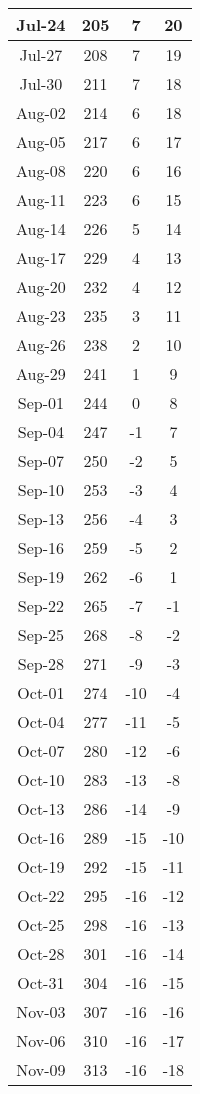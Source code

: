\begin{longtable}{c | c | c | c}
	Jul-24 & 205 & 7 & 20\\\hline
	Jul-27 & 208 & 7 & 19\\\hline
	Jul-30 & 211 & 7 & 18\\\hline
	Aug-02 & 214 & 6 & 18\\\hline
	Aug-05 & 217 & 6 & 17\\\hline
	Aug-08 & 220 & 6 & 16\\\hline
	Aug-11 & 223 & 6 & 15\\\hline
	Aug-14 & 226 & 5 & 14\\\hline
	Aug-17 & 229 & 4 & 13\\\hline
	Aug-20 & 232 & 4 & 12\\\hline
	Aug-23 & 235 & 3 & 11\\\hline
	Aug-26 & 238 & 2 & 10\\\hline
	Aug-29 & 241 & 1 & 9\\\hline
	Sep-01 & 244 & 0 & 8\\\hline
	Sep-04 & 247 & -1 & 7\\\hline
	Sep-07 & 250 & -2 & 5\\\hline
	Sep-10 & 253 & -3 & 4\\\hline
	Sep-13 & 256 & -4 & 3\\\hline
	Sep-16 & 259 & -5 & 2\\\hline
	Sep-19 & 262 & -6 & 1\\\hline
	Sep-22 & 265 & -7 & -1\\\hline
	Sep-25 & 268 & -8 & -2\\\hline
	Sep-28 & 271 & -9 & -3\\\hline
	Oct-01 & 274 & -10 & -4\\\hline
	Oct-04 & 277 & -11 & -5\\\hline
	Oct-07 & 280 & -12 & -6\\\hline
	Oct-10 & 283 & -13 & -8\\\hline
	Oct-13 & 286 & -14 & -9\\\hline
	Oct-16 & 289 & -15 & -10\\\hline
	Oct-19 & 292 & -15 & -11\\\hline
	Oct-22 & 295 & -16 & -12\\\hline
	Oct-25 & 298 & -16 & -13\\\hline
	Oct-28 & 301 & -16 & -14\\\hline
	Oct-31 & 304 & -16 & -15\\\hline
	Nov-03 & 307 & -16 & -16\\\hline
	Nov-06 & 310 & -16 & -17\\\hline
	Nov-09 & 313 & -16 & -18\\\hline

\end{longtable}

